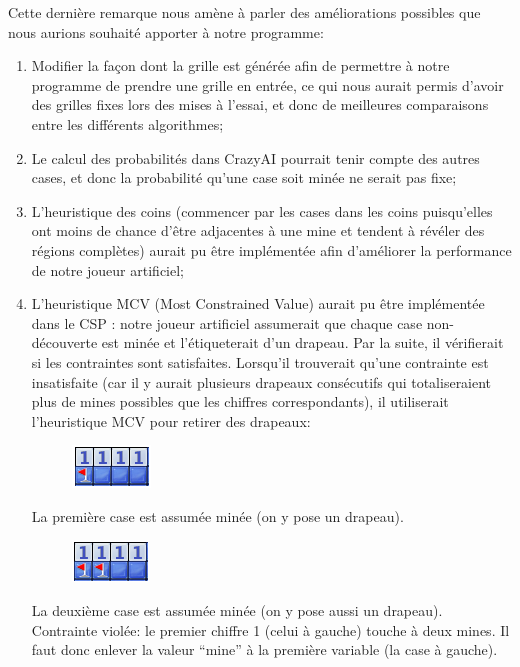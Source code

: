 \documentclass{article}
\begin{document}
Cette dernière remarque nous amène à parler des améliorations possibles que nous aurions souhaité apporter à notre programme:
\begin{enumerate}
        \item Modifier la façon dont la grille est générée afin de permettre à notre programme 
              de prendre une grille en entrée, ce qui nous aurait permis d’avoir des grilles fixes 
              lors des mises à l’essai, et donc de meilleures comparaisons entre les différents algorithmes;
        \item Le calcul des probabilités dans CrazyAI pourrait tenir compte des autres cases, 
              et donc la probabilité qu’une case soit minée ne serait pas fixe;
        \item L’heuristique des coins (commencer par les cases dans les coins puisqu’elles ont 
              moins de chance d’être adjacentes à une mine et tendent à révéler des régions complètes) 
              aurait pu être implémentée afin d’améliorer la performance de notre joueur artificiel;
        \item L’heuristique MCV (Most Constrained Value) aurait pu être implémentée dans le CSP : notre joueur 
              artificiel assumerait que chaque case non-découverte est minée et l’étiqueterait d’un drapeau. 
              Par la suite, il vérifierait si les contraintes sont satisfaites. Lorsqu’il trouverait qu’une 
              contrainte est insatisfaite (car il y aurait plusieurs drapeaux consécutifs qui totaliseraient 
              plus de mines possibles que les chiffres correspondants), il utiliserait l’heuristique MCV pour retirer des drapeaux:

\begin{figure}[h!]
  \centering
  \includegraphics[scale=.5]{./demineur_4.png}
\end{figure}
La première case est assumée minée (on y pose un drapeau).

\begin{figure}[h!]
  \centering
  \includegraphics[scale=.5]{./demineur_5.png}
\end{figure}

La deuxième case est assumée minée (on y pose aussi un drapeau).
Contrainte violée: le premier chiffre 1 (celui à gauche) touche à deux mines. 
Il faut donc enlever la valeur “mine” à la première variable (la case à gauche).


\end{enumerate}
\end{document}
